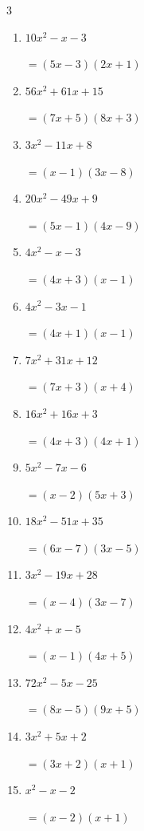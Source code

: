 \begin{multicols}{3}
\begin{enumerate}
        $=(x-1)(7x-8)$

  \item $10x^{2}-x-3$

        $=(5x-3)(2x+1)$

  \item $56x^{2}+61x+15$

        $=(7x+5)(8x+3)$

  \item $3x^{2}-11x+8$

        $=(x-1)(3x-8)$

  \item $20x^{2}-49x+9$

        $=(5x-1)(4x-9)$

  \item $4x^{2}-x-3$

        $=(4x+3)(x-1)$

\columnbreak %

  \item $4x^{2}-3x-1$

        $=(4x+1)(x-1)$

  \item $7x^{2}+31x+12$

        $=(7x+3)(x+4)$

  \item $16x^{2}+16x+3$

        $=(4x+3)(4x+1)$

  \item $5x^{2}-7x-6$

        $=(x-2)(5x+3)$

  \item $18x^{2}-51x+35$

        $=(6x-7)(3x-5)$

  \item $3x^{2}-19x+28$

        $=(x-4)(3x-7)$

  \item $4x^{2}+x-5$

        $=(x-1)(4x+5)$

  \item $72x^{2}-5x-25$

        $=(8x-5)(9x+5)$

  \item $3x^{2}+5x+2$

        $=(3x+2)(x+1)$

  \item $x^{2}-x-2$

        $=(x-2)(x+1)$


\end{enumerate}
\end{multicols}
